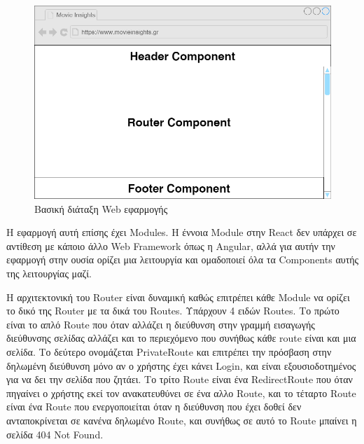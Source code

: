 \begin{figure}[h]
  \centering
  \includegraphics[width=145mm]{Chapters/5 - Architecture/Client/Images/main_struct.png}
  \caption{Βασική διάταξη Web εφαρμογής}
  \label{wire:main}
\end{figure}

Η εφαρμογή αυτή επίσης έχει Modules. Η έννοια Module στην React δεν υπάρχει σε αντίθεση με κάποιο άλλο Web Framework όπως η Angular, αλλά για αυτήν την εφαρμογή στην ουσία ορίζει μια λειτουργία και ομαδοποιεί όλα τα Components αυτής της λειτουργίας μαζί. 

Η αρχιτεκτονική του Router είναι δυναμική καθώς επιτρέπει κάθε Module να ορίζει το δικό της Router με τα δικά του Routes. Υπάρχουν 4 ειδών Routes. Το πρώτο είναι το απλό Route που όταν αλλάζει η διεύθυνση στην γραμμή εισαγωγής διεύθυνσης σελίδας αλλάζει και το περιεχόμενο που συνήθως κάθε route είναι και μια σελίδα. Το δεύτερο ονομάζεται PrivateRoute και επιτρέπει την πρόσβαση στην δηλωμένη διεύθυνση μόνο αν ο χρήστης έχει κάνει Login, και είναι εξουσιοδοτημένος για να δει την σελίδα που ζητάει. Το τρίτο Route είναι ένα RedirectRoute που όταν πηγαίνει ο χρήστης εκεί τον ανακατευθύνει σε ένα αλλο Route, και το τέταρτο Route είναι ένα Route που ενεργοποιείται όταν η διεύθυνση που έχει δοθεί δεν ανταποκρίνεται σε κανένα δηλωμένο Route, και συνήθως σε αυτό το Route μπαίνει η σελίδα 404 Not Found. 


